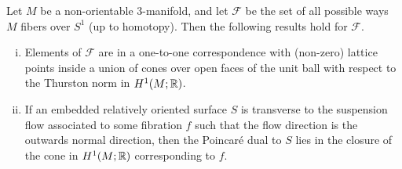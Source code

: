 \begin{thm}
  \label{thm:NOThur1}
  Let $M$ be a non-orientable $3$-manifold, and let $\mathcal{F}$ be the set of all possible
  ways $M$ fibers over $S^1$ (up to homotopy). Then the following results hold for $\mathcal{F}$.
  \begin{enumerate}[(i)]
  \item Elements of $\mathcal{F}$ are in a one-to-one correspondence with (non-zero) lattice points
    inside a union of cones over open faces of the unit ball with respect to the Thurston norm
    in $H^1(M; \mathbb{R})$.
  \item If an embedded relatively oriented surface $S$ is transverse to the suspension flow
    associated to some fibration $f$ such that the flow direction is the outwards normal direction,
    then the Poincar\'e dual to $S$ lies in the closure of the cone in $H^1(M;\mathbb{R})$ corresponding to $f$.
  \end{enumerate}
\end{thm}

